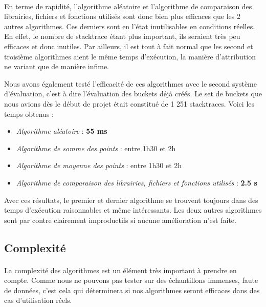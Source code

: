 \documentclass{article}
\begin{document}
\paragraph{}
En terme de rapidité, l'algorithme aléatoire et l'algorithme de comparaison des librairies, fichiers et fonctions utilisés sont donc bien plus efficaces que les 2 autres algorithmes. Ces derniers sont en l'état inutilisables en conditions réelles. En effet, le nombre de stacktrace étant plus important, ils seraient très peu efficaces et donc inutiles. Par ailleurs, il est tout à fait normal que les second et troisième algorithmes aient le même temps d'exécution, la manière d'attribution ne variant que de manière infime.

Nous avons également testé l'efficacité de ces algorithmes avec le second système d'évaluation, c'est à dire l'évaluation des buckets déjà créés. Le set de buckets que nous avions dès le début de projet était constitué de 1 251 stacktraces. Voici les temps obtenus :

\begin{itemize}
\item \textit{Algorithme aléatoire} : \textbf{55 ms}
\item \textit{Algorithme de somme des points} : entre 1h30 et 2h
\item \textit{Algorithme de moyenne des points} : entre 1h30 et 2h 
\item \textit{Algorithme de comparaison des librairies, fichiers et fonctions utilisés} : \textbf{2.5 s}
\end{itemize}

Avec ces résultats, le premier et dernier algorithme se trouvent toujours dans des temps d'exécution raisonnables et même intéressants. Les deux autres algorithmes sont par contre clairement improductifs si aucune amélioration n'est faite.

\subsection{Complexité}

\paragraph{}
La complexité des algorithmes est un élément très important à prendre en compte. Comme nous ne pouvons pas tester sur des échantillons immenses, faute de données, c'est cela qui déterminera si nos algorithmes seront efficaces dans des cas d'utilisation réels.
\end{document}
